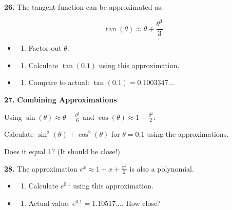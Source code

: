 \documentclass[
  11pt,
]{article}
\providecommand{\tightlist}{%
  \setlength{\itemsep}{0pt}\setlength{\parskip}{0pt}}
\begin{document}
\textbf{26.} The tangent function can be approximated as:

\[\tan(\theta) \approx \theta + \frac{\theta^3}{3}\]

\begin{itemize}
\item
  \begin{enumerate}
  \def\labelenumi{(\alph{enumi})}
  \tightlist
  \item
    Factor out \(\theta\).
  \end{enumerate}
\item
  \begin{enumerate}
  \def\labelenumi{(\alph{enumi})}
  \setcounter{enumi}{1}
  \tightlist
  \item
    Calculate \(\tan(0.1)\) using this approximation.
  \end{enumerate}
\item
  \begin{enumerate}
  \def\labelenumi{(\alph{enumi})}
  \setcounter{enumi}{2}
  \tightlist
  \item
    Compare to actual: \(\tan(0.1) = 0.1003347...\)
  \end{enumerate}
\end{itemize}

\textbf{27.} \textbf{Combining Approximations}

Using \(\sin(\theta) \approx \theta - \frac{\theta^3}{6}\) and
\(\cos(\theta) \approx 1 - \frac{\theta^2}{2}\):

Calculate \(\sin^2(\theta) + \cos^2(\theta)\) for \(\theta = 0.1\) using
the approximations.

Does it equal 1? (It should be close!)

\textbf{28.} The approximation \(e^x \approx 1 + x + \frac{x^2}{2}\) is
also a polynomial.

\begin{itemize}
\item
  \begin{enumerate}
  \def\labelenumi{(\alph{enumi})}
  \tightlist
  \item
    Calculate \(e^{0.1}\) using this approximation.
  \end{enumerate}
\item
  \begin{enumerate}
  \def\labelenumi{(\alph{enumi})}
  \setcounter{enumi}{1}
  \tightlist
  \item
    Actual value: \(e^{0.1} = 1.10517...\). How close?
  \end{enumerate}
\end{itemize}
\end{document}
